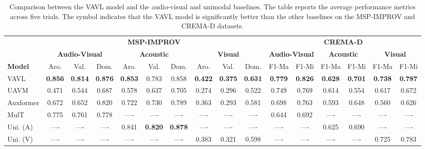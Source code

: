 \documentclass{article}
\begin{document}
\begin{table*}[ht]
\captionsetup{justification=centering}
\caption{Comparison between the VAVL model and the audio-visual and unimodal baselines. The table reports the average performance metrics across five trials. The symbol   indicates that the VAVL model is significantly better than the other baselines on the MSP-IMPROV and CREMA-D datasets. }
\label{tab:performances}
\centering
\setlength\tabcolsep{.85pt}
\begin{tabular*}{\textwidth}{@{\extracolsep{\fill}}l|*{9}{c}|*{6}{c}}
\toprule
& \multicolumn{9}{c|}{\textbf{MSP-IMPROV}} & \multicolumn{6}{c}{\textbf{CREMA-D}} \\
\cmidrule(lr){2-10} \cmidrule(lr){11-16}
 & \multicolumn{3}{c}{\textbf{Audio-Visual}} & \multicolumn{3}{c}{\textbf{Acoustic}} & \multicolumn{3}{c|}{\textbf{Visual}} & \multicolumn{2}{c}{\textbf{Audio-Visual}} & \multicolumn{2}{c}{\textbf{Acoustic}} & \multicolumn{2}{c}{\textbf{Visual}} \\
\cmidrule(lr){2-4} \cmidrule(lr){5-7} \cmidrule(lr){8-10} \cmidrule(lr){11-12} \cmidrule(lr){13-14} \cmidrule(lr){15-16} 
 \textbf{Model} & Aro. & Val. & Dom. & Aro. & Val. & Dom. & Aro. & Val. & Dom. & F1-Ma & F1-Mi & F1-Ma & F1-Mi & F1-Ma & F1-Mi \\
\midrule
VAVL & \textbf{0.856} & \textbf{0.814} & \textbf{0.876} & \textbf{0.853} & 0.783 & 0.858 & \textbf{0.422} & \textbf{0.375} & \textbf{0.631} & \textbf{0.779} & \textbf{0.826} & \textbf{0.628} & \textbf{0.701} & \textbf{0.738} & \textbf{0.787} \\
UAVM & 0.471 & 0.544 & 0.687 & 0.578 & 0.637 & 0.705 & 0.274 & 0.296 & 0.522 & 0.749 & 0.769 & 0.614 & 0.554 & 0.617 & 0.672 \\
Auxformer & 0.672 & 0.652 & 0.820 & 0.722 & 0.730 & 0.789 & 0.363 & 0.293 & 0.581 & 0.698 & 0.763 & 0.593 & 0.648 & 0.560 & 0.626 \\
MulT & 0.775 & 0.761 & 0.778 & ---- & ---- & ---- & ---- & ---- & ---- & 0.644 & 0.692 & ---- & ---- & ---- & ----  \\
Uni. (A) & ---- & ---- & ---- & 0.841 & \textbf{0.820} & \textbf{0.878} & ---- & ---- & ---- & ---- & ---- & 0.625 & 0.690 & ---- & ----  \\
Uni. (V) & ---- & ---- & ---- & ---- & ---- & ---- & 0.383 & 0.321 & 0.598 & ---- & ---- & ---- & ---- & 0.725 & 0.783 \\
\bottomrule
\end{tabular*}
\end{table*}
\end{document}

